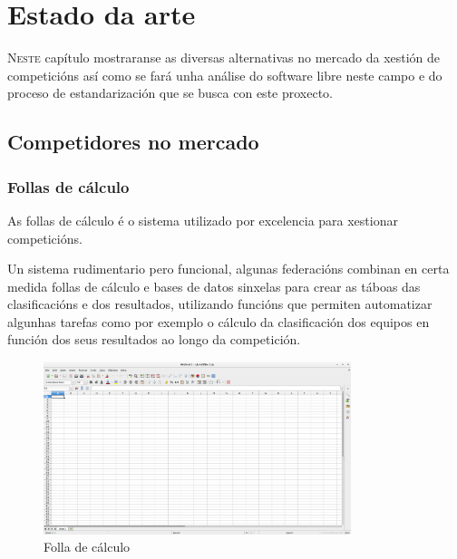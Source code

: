 \chapter{Estado da arte}
\minitoc
\label{chap:Estadodaarte}
\vspace{0.5cm}


  \lettrine{N}{este} capítulo mostraranse as diversas alternativas no mercado da 
xestión de competicións así como se fará unha análise do software libre neste campo e do 
proceso de estandarización que se busca con este proxecto.

\clearpage

  \section{Competidores no mercado}

    \subsection{Follas de cálculo}
    As follas de cálculo é o sistema utilizado por excelencia para xestionar competicións.
    
    Un sistema rudimentario pero funcional, algunas federacións combinan en certa medida 
follas de cálculo e bases de datos sinxelas para crear as táboas das 
clasificacións e dos resultados, utilizando funcións que permiten automatizar algunhas 
tarefas como por exemplo o cálculo da clasificación dos equipos en función dos 
seus resultados ao longo da competición.

    \begin{figure}[h!]
	  \begin{center}
	    \includegraphics[width=0.8\textwidth]{./img/calculo.png}
	    \caption{Folla de cálculo}
	  \end{center}
    \end{figure}

